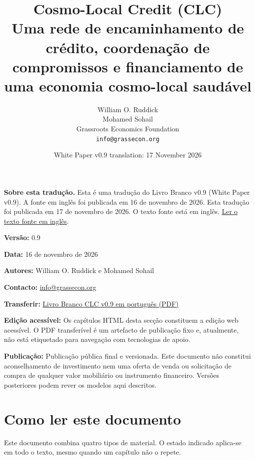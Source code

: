 \documentclass[11pt]{article}
\title{Cosmo-Local Credit (CLC)\\Uma rede de encaminhamento de crédito, coordenação de compromissos e financiamento de uma economia cosmo-local saudável}
\author{William O. Ruddick \\ Mohamed Sohail \\ Grassroots Economics Foundation \\ \texttt{info@grassecon.org}}
\date{White Paper v0.9 translation: 17 November 2026}
\begin{document}
\maketitle
\tableofcontents
\newpage
\sloppy
\RaggedRight

\textbf{Sobre esta tradução.} Esta é uma tradução do Livro Branco v0.9 (White Paper v0.9). A fonte em inglês foi publicada em 16 de novembro de 2026. Esta tradução foi publicada em 17 de novembro de 2026. O texto fonte está em inglês. \href{https://docs.cosmolocal.credit/white-paper}{Ler o texto fonte em inglês}.

\textbf{Versão:} 0.9

\textbf{Data:} 16 de novembro de 2026

\textbf{Autores:} William O. Ruddick e Mohamed Sohail

\textbf{Contacto:} \href{mailto:info@grassecon.org}{info@grassecon.org}

\textbf{Transferir:} \href{https://docs.cosmolocal.credit/white-paper/Cosmo-Local-Credit-CLC-White-Paper-v9-pt.pdf}{Livro Branco CLC v0.9 em português (PDF)}

\textbf{Edição acessível:} Os capítulos HTML desta secção constituem a edição web acessível. O PDF transferível é um artefacto de publicação fixo e, atualmente, não está etiquetado para navegação com tecnologias de apoio.

\textbf{Publicação:} Publicação pública final e versionada. Este documento não constitui aconselhamento de investimento nem uma oferta de venda ou solicitação de compra de qualquer valor mobiliário ou instrumento financeiro. Versões posteriores podem rever os modelos aqui descritos.

\section*{Como ler este documento}

Este documento combina quatro tipos de material. O estado indicado aplica-se em todo o texto, mesmo quando um capítulo não o repete.
\end{document}
